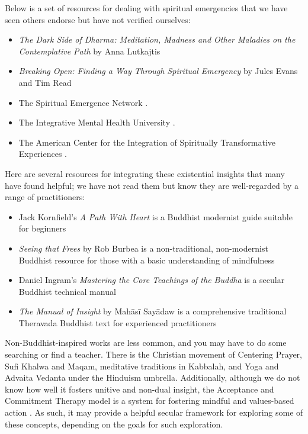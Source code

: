 \documentclass[12pt,letterpaper]{book}
\begin{document}
Below is a set of resources for dealing with spiritual emergencies that we have seen others endorse but have not verified ourselves:
\begin{itemize}
    \item \textit{The Dark Side of Dharma: Meditation, Madness and Other Maladies on the Contemplative Path} by Anna Lutkajtis \cite{lutkajtis2021dark}
    \item \textit{Breaking Open: Finding a Way Through Spiritual Emergency} by Jules Evans and Tim Read \cite{evans2020}
    \item The Spiritual Emergence Network \cite{sen}.
    \item The Integrative Mental Health University \cite{imhu}.
    \item The American Center for the Integration of Spiritually Transformative Experiences \cite{aciste}.
\end{itemize}

Here are several resources for integrating these existential insights that many have found helpful; we have not read them but know they are well-regarded by a range of practitioners:
\begin{itemize}
    \item Jack Kornfield's \textit{A Path With Heart} is a Buddhist modernist guide suitable for beginners \cite{kornfield1993path}
    \item \textit{Seeing that Frees} by Rob Burbea is a non-traditional, non-modernist Buddhist resource for those with a basic understanding of mindfulness \cite{burbea2014seeing}
    \item Daniel Ingram's \textit{Mastering the Core Teachings of the Buddha} is a secular Buddhist technical manual \cite{ingram2018mastering}
    \item \textit{The Manual of Insight} by Mahāsī Sayādaw is a comprehensive traditional Theravada Buddhist text for experienced practitioners \cite{sayadaw2016manual}
\end{itemize}
Non-Buddhist-inspired works are less common, and you may have to do some searching or find a teacher. There is the Christian movement of Centering Prayer, Sufi Khalwa and Maqam, meditative traditions in Kabbalah, and Yoga and Advaita Vedanta under the Hinduism umbrella. Additionally, although we do not know how well it fosters unitive and non-dual insight, the Acceptance and Commitment Therapy model is a system for fostering mindful and values-based action \cite{actSimple}. As such, it may provide a helpful secular framework for exploring some of these concepts, depending on the goals for such exploration.
\end{document}
